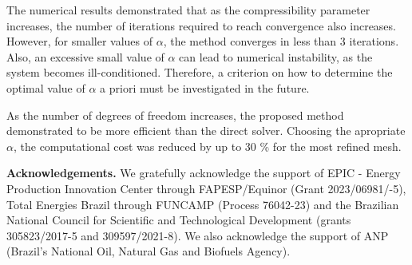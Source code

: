 \documentclass{wccm2024}
\begin{document}
The numerical results demonstrated that as the compressibility parameter increases, the number of iterations required to reach convergence also increases. However, for smaller values of $\alpha$, the method converges in less than 3 iterations. Also, an excessive small value of $\alpha$ can lead to numerical instability, as the system becomes ill-conditioned. Therefore, a criterion on how to determine the optimal value of $\alpha$ a priori must be investigated in the future.

As the number of degrees of freedom increases, the proposed method demonstrated to be more efficient than the direct solver. Choosing the apropriate $\alpha$, the computational cost was reduced by up to 30 \% for the most refined mesh.

\vspace{20pt}
\noindent \textbf{Acknowledgements.} We gratefully acknowledge the support of EPIC - Energy Production Innovation Center through FAPESP/Equinor (Grant 2023/06981/-5),  Total Energies Brazil through FUNCAMP (Process 76042-23) and the Brazilian National Council for Scientific and Technological Development (grants 305823/2017-5 and 309597/2021-8). We also acknowledge the support of ANP (Brazil’s National Oil, Natural Gas and Biofuels Agency).
\vspace{12pt}



\end{document}
